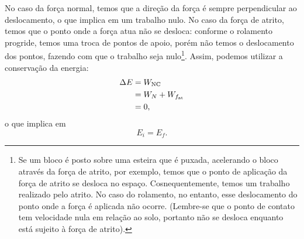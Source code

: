 No caso da força normal, temos que a direção da força é sempre perpendicular ao deslocamento, o que implica em um trabalho nulo. No caso da força de atrito, temos que o ponto onde a força atua não se desloca: conforme o rolamento progride, temos uma troca de pontos de apoio, porém não temos o deslocamento dos pontos, fazendo com que o trabalho seja nulo\footnote{Se um bloco é posto sobre uma esteira que é puxada, acelerando o bloco através da força de atrito, por exemplo, temos que o ponto de aplicação da força de atrito se desloca no espaço. Cosnequentemente, temos um trabalho realizado pelo atrito. No caso do rolamento, no entanto, esse deslocamento do ponto onde a força é aplicada não ocorre. (Lembre-se que o ponto de contato tem velocidade nula em relação ao solo, portanto não se desloca enquanto está sujeito à força de atrito).}. Assim, podemos utilizar a conservação da energia:
\begin{align}
    \Delta E &= W_{\rm{NC}} \\
    &= W_N + W_{f_{\rm{at}}} \\
    &=0,
\end{align}
%
o que implica em
\begin{equation}
    E_i = E_f.
\end{equation}

